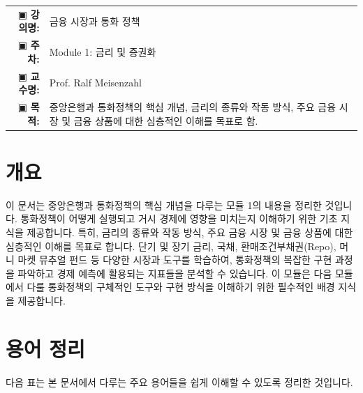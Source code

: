 \documentclass[11pt,a4paper]{article}
\makeatletter
\theoremstyle{definition}
\newcommand{\metainfo}[4]{
\begin{tcolorbox}[
    colback=lightpurple,
    colframe=darkpurple,
    boxrule=1pt,
    arc=2mm,
    left=10pt,
    right=10pt,
    top=8pt,
    bottom=8pt
]
\begin{tabular}{@{}rl@{}}
▣ \textbf{강의명:} & #1 \\[0.3em]
▣ \textbf{주차:} & #2 \\[0.3em]
▣ \textbf{교수명:} & #3 \\[0.3em]
▣ \textbf{목적:} & \begin{minipage}[t]{0.75\textwidth}#4\end{minipage}
\end{tabular}
\end{tcolorbox}
}
\makeatother
\begin{document}
\thispagestyle{firstpage}

\metainfo{금융 시장과 통화 정책}{Module 1: 금리 및 증권화}{Prof. Ralf Meisenzahl}{중앙은행과 통화정책의 핵심 개념, 금리의 종류와 작동 방식, 주요 금융 시장 및 금융 상품에 대한 심층적인 이해를 목표로 함.}

\tableofcontents

\newpage

\section{개요}
이 문서는 중앙은행과 통화정책의 핵심 개념을 다루는 모듈 1의 내용을 정리한 것입니다.
통화정책이 어떻게 실행되고 거시 경제에 영향을 미치는지 이해하기 위한 기초 지식을 제공합니다.
특히, 금리의 종류와 작동 방식, 주요 금융 시장 및 금융 상품에 대한 심층적인 이해를 목표로 합니다.
단기 및 장기 금리, 국채, 환매조건부채권(Repo), 머니 마켓 뮤추얼 펀드 등 다양한 시장과 도구를 학습하여,
통화정책의 복잡한 구현 과정을 파악하고 경제 예측에 활용되는 지표들을 분석할 수 있습니다.
이 모듈은 다음 모듈에서 다룰 통화정책의 구체적인 도구와 구현 방식을 이해하기 위한 필수적인 배경 지식을 제공합니다.

\newpage
\section{용어 정리}
다음 표는 본 문서에서 다루는 주요 용어들을 쉽게 이해할 수 있도록 정리한 것입니다.
\end{document}
